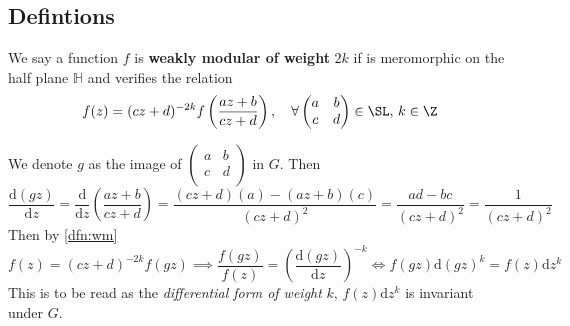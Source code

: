 \documentclass[12pt]{article}
\theoremstyle{definition}
\begin{document}
\subsection{Defintions}
\begin{dfn}[label = wm]
We say a function \(f\) is \textbf{weakly modular of weight} \(2k\) if is meromorphic on the half plane \(\mathbb{H}\) and verifies the relation
\[
    f(z)= (cz+d)^{-2k}f\left(\frac{az+b}{cz+d}\right),\quad \forall \begin{pmatrix}
        a &  b \\
        c &  d \\
    \end{pmatrix} \in \SL, \, k\in\Z
\]
\end{dfn} 
We denote \(g\) as the image of $\begin{pmatrix}
    a &  b \\
    c &  d \\
\end{pmatrix}$ in \(G\). Then
\[
    \frac{\mathrm{d}(gz)}{\mathrm{d}z} = \frac{\mathrm{d}}{\mathrm{d}z} \left(\frac{az+b}{cz+d}\right) = \frac{(cz+d)(a)-(az+b)(c)}{(cz+d)^2} = \frac{ad-bc}{(cz+d)^2} = \frac{1}{(cz+d)^2}
\] 
Then by \cref{dfn:wm} 
\[
    f(z) = (cz+d)^{-2k} f(gz) \implies \frac{f(gz)}{f(z)} = \left(\frac{\mathrm{d}(gz)}{\mathrm{d}z} \right)^{-k} \iff f(gz)\mathrm{d}(gz)^k = f(z)\mathrm{d}z^k  
\]
This is to be read as the \textit{differential form of weight} \(k\), \(f(z)\mathrm{d}z^k \) is invariant under \(G\).
\end{document}

